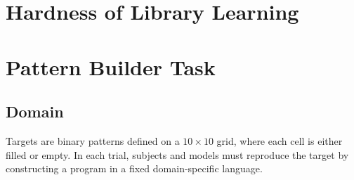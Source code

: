 \documentclass{article}
\begin{document}












{
\small

}



\clearpage

\appendix


\section{Hardness of Library Learning}\label{si:proof}


\section{Pattern Builder Task}\label{si:task}

\subsection{Domain}
Targets are binary patterns defined on a $10\times10$ grid, where each
cell is either filled or empty. In each trial, subjects and models must
reproduce the target by constructing a program in a fixed
domain-specific language.
\end{document}
